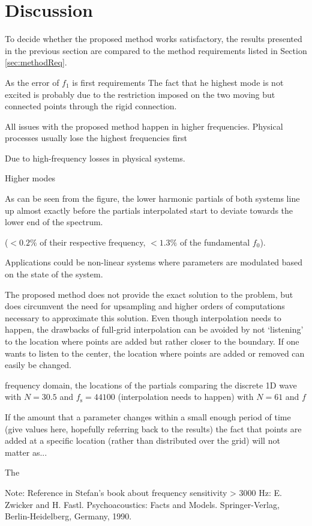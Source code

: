 \section{Discussion}
To decide whether the proposed method works satisfactory, the results presented in the previous section are compared to the method requirements listed in Section \eqref{sec:methodReq}. 



As the error of $f_1$ is  first requirements The fact that he highest mode is not excited is probably due to the restriction imposed on the two moving but connected points through the rigid connection.



All issues with the proposed method happen in higher frequencies. Physical processes usually lose the highest frequencies first

Due to high-frequency losses in physical systems. 

Higher modes

As can be seen from the figure, the lower harmonic partials of both systems line up almost exactly before the partials interpolated start to deviate towards the lower end of the spectrum.

($<0.2\%$ of their respective frequency, $<1.3\%$ of the fundamental $f_0$). 


Applications could be non-linear systems where parameters are modulated based on the state of the system. 

The proposed method does not provide the exact solution to the problem, but does circumvent the need for upsampling and higher orders of computations necessary to approximate this solution. Even though interpolation needs to happen, the drawbacks of full-grid interpolation can be avoided by not `listening' to the location where points are added but rather closer to the boundary. If one wants to listen to the center, the location where points are added or removed can easily be changed.


frequency domain, the locations of the partials comparing the discrete 1D wave with $N = 30.5$ and $f_\text{s} = 44100$ (interpolation needs to happen) with $N = 61$ and $f$ 

If the amount that a parameter changes within a small enough period of time (give values here, hopefully referring back to the results) the fact that points are added at a specific location (rather than distributed over the grid) will not matter as... 

The 


Note: Reference in Stefan's book about frequency sensitivity > 3000 Hz: E. Zwicker and H. Fastl. Psychoacoustics: Facts and Models. Springer-Verlag, Berlin-Heidelberg,
Germany, 1990.
